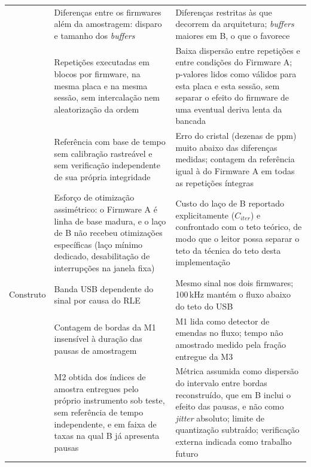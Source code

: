 {\begin{xltabular}{\linewidth}{|>{\raggedright\arraybackslash}p{2.0cm}|>{\raggedright\arraybackslash}X|>{\raggedright\arraybackslash}X|}
                       & Diferenças entre os firmwares além da amostragem: disparo e tamanho dos \emph{buffers}
                       & Diferenças restritas às que decorrem da arquitetura; \emph{buffers} maiores em B, o que o favorece                      \\ 
                       & Repetições executadas em blocos por firmware, na mesma placa e na mesma sessão, sem intercalação nem aleatorização da ordem
                       & Baixa dispersão entre repetições e entre condições do Firmware A; p-valores lidos como válidos para esta placa e esta sessão, sem separar o efeito do firmware de uma eventual deriva lenta da bancada \\ 
                       & Referência com base de tempo sem calibração rastreável e sem verificação independente de sua própria integridade
                       & Erro do cristal (dezenas de ppm) muito abaixo das diferenças medidas; contagem da referência igual à do Firmware A em todas as repetições íntegras \\ 
                       & Esforço de otimização assimétrico: o Firmware A é linha de base madura, e o laço de B não recebeu otimizações específicas (laço mínimo dedicado, desabilitação de interrupções na janela fixa)
                       & Custo do laço de B reportado explicitamente ($C_{iter}$) e confrontado com o teto teórico, de modo que o leitor possa separar o teto da técnica do teto desta implementação \\ \hline
    Construto          & Banda \acs{USB} dependente do sinal por causa do \acs{RLE}
                       & Mesmo sinal nos dois firmwares; 100\,kHz mantém o fluxo abaixo do teto do \acs{USB}                                     \\ 
                       & Contagem de bordas da M1 insensível à duração das pausas de amostragem
                       & M1 lida como detector de emendas no fluxo; tempo não amostrado medido pela fração entregue da M3 \\ 
                       & M2 obtida dos índices de amostra entregues pelo próprio instrumento sob teste, sem referência de tempo independente, e em faixa de taxas na qual B já apresenta pausas
                       & Métrica assumida como dispersão do intervalo entre bordas reconstruído, que em B inclui o efeito das pausas, e não como \emph{jitter} absoluto; limite de quantização subtraído; verificação externa indicada como trabalho futuro \\ 

\end{xltabular}}

